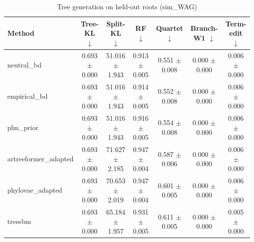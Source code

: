 \begin{table}[t]\centering
\caption{Tree generation on held-out roots (sim_WAG)}
\begin{tabular}{lcccccc}
\toprule
Method & Tree-KL $\downarrow$ & Split-KL $\downarrow$ & RF $\downarrow$ & Quartet $\downarrow$ & Branch-W1 $\downarrow$ & Term-edit $\downarrow$ \\
\midrule
neutral\_bd & 0.693 $\pm$ 0.000 & 51.016 $\pm$ 1.943 & 0.913 $\pm$ 0.005 & 0.551 $\pm$ 0.008 & 0.000 $\pm$ 0.000 & 0.006 $\pm$ 0.000 \\
empirical\_bd & 0.693 $\pm$ 0.000 & 51.016 $\pm$ 1.943 & 0.914 $\pm$ 0.005 & 0.552 $\pm$ 0.008 & 0.000 $\pm$ 0.000 & 0.006 $\pm$ 0.000 \\
plm\_prior & 0.693 $\pm$ 0.000 & 51.016 $\pm$ 1.943 & 0.916 $\pm$ 0.005 & 0.554 $\pm$ 0.008 & 0.000 $\pm$ 0.000 & 0.006 $\pm$ 0.000 \\
artreeformer\_adapted & 0.693 $\pm$ 0.000 & 71.627 $\pm$ 2.185 & 0.947 $\pm$ 0.004 & 0.587 $\pm$ 0.006 & 0.000 $\pm$ 0.000 & 0.006 $\pm$ 0.000 \\
phylovae\_adapted & 0.693 $\pm$ 0.000 & 70.653 $\pm$ 2.019 & 0.947 $\pm$ 0.004 & 0.601 $\pm$ 0.005 & 0.000 $\pm$ 0.000 & 0.006 $\pm$ 0.000 \\
treesbm & 0.693 $\pm$ 0.000 & 65.184 $\pm$ 1.957 & 0.931 $\pm$ 0.005 & 0.611 $\pm$ 0.005 & 0.000 $\pm$ 0.000 & 0.005 $\pm$ 0.000 \\
\bottomrule
\end{tabular}
\end{table}